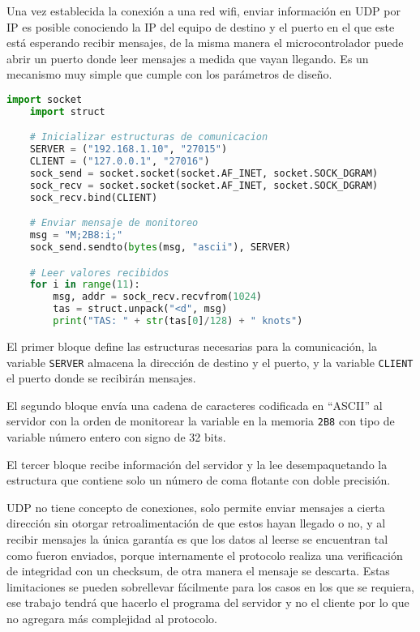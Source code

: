 Una vez establecida la conexión a una red wifi, enviar información en UDP por IP es posible conociendo la IP del equipo de destino y el puerto en el que este está esperando recibir mensajes, de la misma manera el microcontrolador puede abrir un puerto donde leer mensajes a medida que vayan llegando. Es un mecanismo muy simple que cumple con los parámetros de diseño.

\begin{lstlisting}[language=Python]
	import socket
	import struct

	# Inicializar estructuras de comunicacion
	SERVER = ("192.168.1.10", "27015")
	CLIENT = ("127.0.0.1", "27016")
	sock_send = socket.socket(socket.AF_INET, socket.SOCK_DGRAM)
	sock_recv = socket.socket(socket.AF_INET, socket.SOCK_DGRAM)
	sock_recv.bind(CLIENT)

	# Enviar mensaje de monitoreo
	msg = "M;2B8:i;"
	sock_send.sendto(bytes(msg, "ascii"), SERVER)

	# Leer valores recibidos
	for i in range(11):
		msg, addr = sock_recv.recvfrom(1024)
		tas = struct.unpack("<d", msg)
		print("TAS: " + str(tas[0]/128) + " knots")
\end{lstlisting}

El primer bloque define las estructuras necesarias para la comunicación, la variable \lstinline{SERVER} almacena la dirección de destino y el puerto, y la variable \lstinline{CLIENT} el puerto donde se recibirán mensajes.

El segundo bloque envía una cadena de caracteres codificada en ``ASCII'' al servidor con la orden de monitorear la variable en la memoria \lstinline{2B8} con tipo de variable número entero con signo de 32 bits.

El tercer bloque recibe información del servidor y la lee desempaquetando la estructura que contiene solo un número de coma flotante con doble precisión.

UDP no tiene concepto de conexiones, solo permite enviar mensajes a cierta dirección sin otorgar retroalimentación de que estos hayan llegado o no, y al recibir mensajes la única garantía es que los datos al leerse se encuentran tal como fueron enviados, porque internamente el protocolo realiza una verificación de integridad con un checksum, de otra manera el mensaje se descarta. Estas limitaciones se pueden sobrellevar fácilmente para los casos en los que se requiera, ese trabajo tendrá que hacerlo el programa del servidor y no el cliente por lo que no agregara más complejidad al protocolo.

